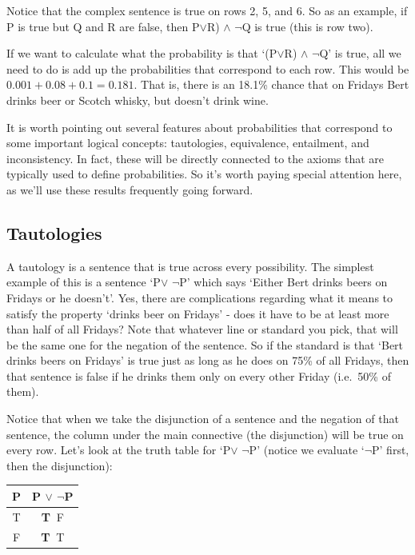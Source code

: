 \documentclass[]{tufte-book}
\begin{document}
Notice that the complex sentence is true on rows 2, 5, and 6. So as an example, if P is true but Q and R are false, then P\(\vee\)R) \(\wedge\) \(\neg\)Q is true (this is row two).

If we want to calculate what the probability is that `(P\(\vee\)R) \(\wedge\) \(\neg\)Q' is true, all we need to do is add up the probabilities that correspond to each row. This would be \(0.001+0.08+0.1 = 0.181\). That is, there is an 18.1\% chance that on Fridays Bert drinks beer or Scotch whisky, but doesn't drink wine.

It is worth pointing out several features about probabilities that correspond to some important logical concepts: tautologies, equivalence, entailment, and inconsistency. In fact, these will be directly connected to the axioms that are typically used to define probabilities. So it's worth paying special attention here, as we'll use these results frequently going forward.

\hypertarget{tautologies}{%
\subsection{Tautologies}\label{tautologies}}

A tautology is a sentence that is true across every possibility. The simplest example of this is a sentence `P\(\vee\) \(\neg\)P' which says `Either Bert drinks beers on Fridays or he doesn't'. Yes, there are complications regarding what it means to satisfy the property `drinks beer on Fridays' - does it have to be at least more than half of all Fridays? Note that whatever line or standard you pick, that will be the same one for the negation of the sentence. So if the standard is that `Bert drinks beers on Fridays' is true just as long as he does on 75\% of all Fridays, then that sentence is false if he drinks them only on every other Friday (i.e.~50\% of them).

Notice that when we take the disjunction of a sentence and the negation of that sentence, the column under the main connective (the disjunction) will be true on every row. Let's look at the truth table for `P\(\vee\) \(\neg\)P' (notice we evaluate `\(\neg\)P' first, then the disjunction):

\begin{longtable}[]{@{}cc@{}}
\toprule
P & P \(\vee\) \(\neg\)P\tabularnewline
\midrule
\endhead
T & \textbf{T\(~\)} F\tabularnewline
F & \textbf{T\(~\)} T\tabularnewline
\bottomrule
\end{longtable}
\end{document}
